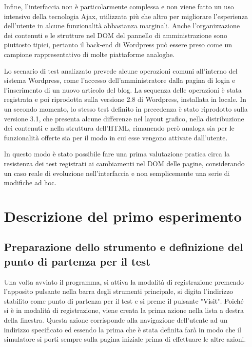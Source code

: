 \documentclass[12pt]{toptesi}
\begin{document}
Infine, l'interfaccia non è particolarmente complessa e non viene fatto un uso intensivo della tecnologia Ajax, utilizzata più che altro per migliorare l'esperienza dell'utente in alcune funzionalità abbastanza marginali. Anche l'organizzazione dei contenuti e le strutture nel DOM del pannello di amministrazione sono piuttosto tipici, pertanto il back-end di Wordpress può essere preso come un campione rappresentativo di molte piattaforme analoghe.

Lo scenario di test analizzato prevede alcune operazioni comuni all'interno del sistema Wordpress, come l'accesso dell'amministratore dalla pagina di login e l'inserimento di un nuovo articolo del blog. La sequenza delle operazioni è stata registrata e poi riprodotta sulla versione 2.8 di Wordpress, installata in locale. In un secondo momento, lo stesso test definito in precedenza è stato riprodotto sulla versione 3.1, che presenta alcune differenze nel layout grafico, nella distribuzione dei contenuti e nella struttura dell'HTML, rimanendo però analoga sia per le funzionalità offerte sia per il modo in cui esse vengono attivate dall'utente. 

In questo modo è stato possibile fare una prima valutazione pratica circa la resistenza dei test registrati ai cambiamenti nel DOM delle pagine, considerando un caso reale di evoluzione nell'interfaccia e non semplicemente una serie di modifiche ad hoc.

\section{Descrizione del primo esperimento}

\subsection{Preparazione dello strumento e definizione del punto di partenza per il test}

Una volta avviato il programma, si attiva la modalità di registrazione premendo l'apposito pulsante nella barra degli strumenti principale, si digita l'indirizzo stabilito come punto di partenza per il test e si preme il pulsante "Visit". Poiché si è in modalità di registrazione, viene creata la prima azione nella lista a destra della finestra. Questa azione corrisponde alla navigazione dell'utente ad un indirizzo specificato ed essendo la prima che è stata definita farà in modo che il simulatore si porti sempre sulla pagina iniziale prima di effettuare le altre azioni.
\end{document}
